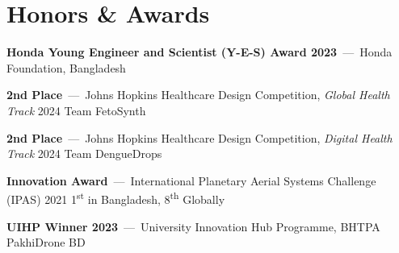 \documentclass[a4paper,10pt]{article}
\begin{document}
\section{Honors \& Awards}
\begin{description}[font=$\bullet$]
  \item {\textbf{Honda Young Engineer and Scientist (Y-E-S) Award 2023}~---~Honda Foundation, Bangladesh}
  \vspace{-5pt}
  \item {\textbf{2nd Place}~---~Johns Hopkins Healthcare Design Competition, \textit{Global Health Track} 2024 \hfill Team FetoSynth}
  \vspace{-5pt}
  \item {\textbf{2nd Place}~---~Johns Hopkins Healthcare Design Competition, \textit{Digital Health Track} 2024 \hfill Team DengueDrops}
  \vspace{-5pt}
  \item {\textbf{Innovation Award}~---~International Planetary Aerial Systems Challenge (IPAS) 2021 \hfill 1\textsuperscript{st} in Bangladesh, 8\textsuperscript{th} Globally}
  \vspace{-5pt}
  \item {\textbf{UIHP Winner 2023}~---~University Innovation Hub Programme, BHTPA \hfill PakhiDrone BD}
\end{description}
\end{document}
